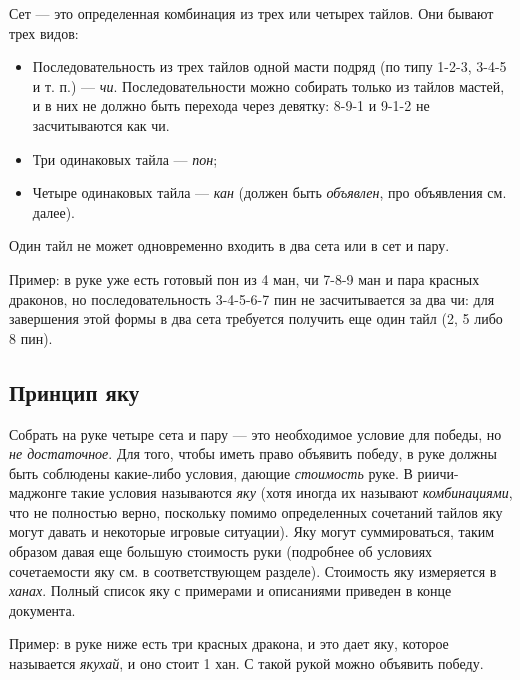Сет --- это определенная комбинация из трех или четырех тайлов. Они бывают трех видов:

\begin{itemize}
	\item Последовательность из трех тайлов одной масти подряд (по типу 1-2-3, 3-4-5 и т. п.) --- \textit{чи}. Последовательности можно собирать только из тайлов мастей, и в них не должно быть перехода через девятку: 8-9-1 и 9-1-2 не засчитываются как чи.
	\item Три одинаковых тайла --- \textit{пон};
	\item Четыре одинаковых тайла --- \textit{кан} (должен быть \textit{объявлен}, про объявления см. далее).
\end{itemize}

Один тайл не может одновременно входить в два сета или в сет и пару.

\begin{example}

Пример: в руке уже есть готовый пон из 4 ман, чи 7-8-9 ман и пара красных драконов, но последовательность 3-4-5-6-7 пин не засчитывается за два чи: для завершения этой формы в два сета требуется получить еще один тайл (2, 5 либо 8 пин).
\vspace{5mm}


\end{example}

\subsection{Принцип яку}

Собрать на руке четыре сета и пару --- это необходимое условие для победы, но \textit{не достаточное}. Для того, чтобы иметь право объявить победу, в руке должны быть соблюдены какие-либо условия, дающие \textit{стоимость} руке. В риичи-маджонге такие условия называются \textit{яку} (хотя иногда их называют \textit{комбинациями}, что не полностью верно, поскольку помимо определенных сочетаний тайлов яку могут давать и некоторые игровые ситуации). Яку могут суммироваться, таким образом давая еще большую стоимость руки (подробнее об условиях сочетаемости яку см. в соответствующем разделе). Стоимость яку измеряется в \textit{ханах}. Полный список яку с примерами и описаниями приведен в конце документа.

\begin{example}

	Пример: в руке ниже есть три красных дракона, и это дает яку, которое называется \textit{якухай}, и оно стоит 1 хан. С такой рукой можно объявить победу.
	\vspace{5mm}


\end{example}

